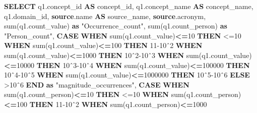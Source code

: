 \documentclass[
]{book}
\newenvironment{Shaded}{\begin{snugshade}}{\end{snugshade}}
\newcommand{\ControlFlowTok}[1]{\textcolor[rgb]{0.13,0.29,0.53}{\textbf{#1}}}
\newcommand{\DecValTok}[1]{\textcolor[rgb]{0.00,0.00,0.81}{#1}}
\newcommand{\FunctionTok}[1]{\textcolor[rgb]{0.00,0.00,0.00}{#1}}
\newcommand{\KeywordTok}[1]{\textcolor[rgb]{0.13,0.29,0.53}{\textbf{#1}}}
\newcommand{\NormalTok}[1]{#1}
\newcommand{\OperatorTok}[1]{\textcolor[rgb]{0.81,0.36,0.00}{\textbf{#1}}}
\newcommand{\OtherTok}[1]{\textcolor[rgb]{0.56,0.35,0.01}{#1}}
\newcommand{\StringTok}[1]{\textcolor[rgb]{0.31,0.60,0.02}{#1}}
\begin{document}
\begin{Shaded}
\begin{Highlighting}[]
\KeywordTok{SELECT}
\NormalTok{    q1.concept\_id }\KeywordTok{AS}\NormalTok{ concept\_id,}
\NormalTok{    q1.concept\_name }\KeywordTok{AS}\NormalTok{ concept\_name,}
\NormalTok{    q1.domain\_id,}
    \KeywordTok{source}\NormalTok{.name }\KeywordTok{AS}\NormalTok{ source\_name,}
    \KeywordTok{source}\NormalTok{.acronym,}
    \FunctionTok{sum}\NormalTok{(q1.count\_value) }\KeywordTok{as} \OtherTok{"Occurrence\_count"}\NormalTok{,}
    \FunctionTok{sum}\NormalTok{(q1.count\_person) }\KeywordTok{as} \OtherTok{"Person\_count"}\NormalTok{,}
    \ControlFlowTok{CASE} 
        \ControlFlowTok{WHEN} \FunctionTok{sum}\NormalTok{(q1.count\_value)}\OperatorTok{\textless{}=}\DecValTok{10}
          \ControlFlowTok{THEN} \StringTok{\textquotesingle{}\textless{}=10\textquotesingle{}}
        \ControlFlowTok{WHEN} \FunctionTok{sum}\NormalTok{(q1.count\_value)}\OperatorTok{\textless{}=}\DecValTok{100}
          \ControlFlowTok{THEN} \StringTok{\textquotesingle{}11{-}10ˆ2\textquotesingle{}}
        \ControlFlowTok{WHEN} \FunctionTok{sum}\NormalTok{(q1.count\_value)}\OperatorTok{\textless{}=}\DecValTok{1000}
          \ControlFlowTok{THEN} \StringTok{\textquotesingle{}10ˆ2{-}10ˆ3\textquotesingle{}}
        \ControlFlowTok{WHEN} \FunctionTok{sum}\NormalTok{(q1.count\_value)}\OperatorTok{\textless{}=}\DecValTok{10000}
          \ControlFlowTok{THEN} \StringTok{\textquotesingle{}10ˆ3{-}10ˆ4\textquotesingle{}}
        \ControlFlowTok{WHEN} \FunctionTok{sum}\NormalTok{(q1.count\_value)}\OperatorTok{\textless{}=}\DecValTok{100000}
          \ControlFlowTok{THEN} \StringTok{\textquotesingle{}10ˆ4{-}10ˆ5\textquotesingle{}}
        \ControlFlowTok{WHEN} \FunctionTok{sum}\NormalTok{(q1.count\_value)}\OperatorTok{\textless{}=}\DecValTok{1000000}
          \ControlFlowTok{THEN} \StringTok{\textquotesingle{}10ˆ5{-}10ˆ6\textquotesingle{}}
        \ControlFlowTok{ELSE} \StringTok{\textquotesingle{}\textgreater{}10ˆ6\textquotesingle{}}
    \ControlFlowTok{END} \KeywordTok{as} \OtherTok{"magnitude\_occurrences"}\NormalTok{,}
    \ControlFlowTok{CASE} 
        \ControlFlowTok{WHEN} \FunctionTok{sum}\NormalTok{(q1.count\_person)}\OperatorTok{\textless{}=}\DecValTok{10}
          \ControlFlowTok{THEN} \StringTok{\textquotesingle{}\textless{}=10\textquotesingle{}}
        \ControlFlowTok{WHEN} \FunctionTok{sum}\NormalTok{(q1.count\_person)}\OperatorTok{\textless{}=}\DecValTok{100}
          \ControlFlowTok{THEN} \StringTok{\textquotesingle{}11{-}10ˆ2\textquotesingle{}}
        \ControlFlowTok{WHEN} \FunctionTok{sum}\NormalTok{(q1.count\_person)}\OperatorTok{\textless{}=}\DecValTok{1000}

\end{Highlighting}
\end{Shaded}
\end{document}
